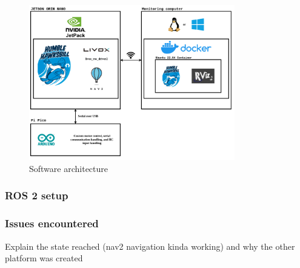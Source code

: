 \documentclass[11pt]{article}
\begin{document}
            \begin{figure}[H]
                \centering
                \includegraphics[width=0.8\textwidth]{Images/Software architecture rover.drawio.png}
                \caption{Software architecture}
                \label{fig:SW_architecture}
            \end{figure}


            \subsubsection{ROS 2 setup}
            


            \subsubsection{Issues encountered}
                
            Explain the state reached (nav2 navigation kinda working) and why the other platform was created
\end{document}
